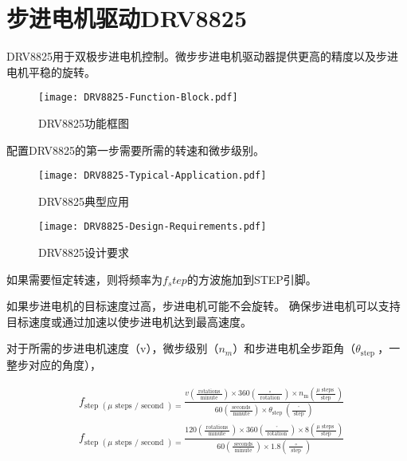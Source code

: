 \section{步进电机驱动DRV8825}

DRV8825用于双极步进电机控制。微步步进电机驱动器提供更高的精度以及步进电机平稳的旋转。

\begin{figure}[htbp]
    \centering
    \texttt{[image: DRV8825-Function-Block.pdf]}
    \caption{DRV8825功能框图}
    \label{fig:DRV8825-Function-Block}
\end{figure}

配置DRV8825的第一步需要所需的转速和微步级别。

\begin{figure}[htbp]
    \centering
    \texttt{[image: DRV8825-Typical-Application.pdf]}
    \caption{DRV8825典型应用}
    \label{fig:DRV8825-Typical-Application}
\end{figure}


\begin{figure}[htbp]
    \centering
    \texttt{[image: DRV8825-Design-Requirements.pdf]}
    \caption{DRV8825设计要求}
    \label{fig:DRV8825-Design-Requirements}
\end{figure}

如果需要恒定转速，则将频率为$f_step$的方波施加到STEP引脚。

如果步进电机的目标速度过高，步进电机可能不会旋转。 确保步进电机可以支持目标速度或通过加速以使步进电机达到最高速度。

对于所需的步进电机速度（v），微步级别（$n_m$）和步进电机全步距角（$\theta_{\text {step }}$，一整步对应的角度），

\begin{equation}
    \begin{aligned}
    &f_{\text {step }(\mu \text { steps } / \text { second })=} \frac{v\left(\frac{\text { rotations }}{\text { minute }}\right) \times 360\left(\frac{\circ}{\text { rotation }}\right) \times n_{\mathrm{m}}\left(\frac{\mu \text { steps }}{\text { step }}\right)}{60\left(\frac{\text { seconds }}{\text { minute }}\right) \times \theta_{\text {step }}\left(\frac{^{\circ}}{\text { step }}\right)}\\
    &f_{\text {step }(\mu \text { steps } / \text { second })=} \frac{120\left(\frac{\text { rotations }}{\text { minute }}\right) \times 360\left(\frac{^{\circ}}{\text { rotation }}\right) \times 8\left(\frac{\mu \text { steps }}{\text { step }}\right)}{60\left(\frac{\text { seconds }}{\text { minute }}\right) \times 1.8\left(\frac{\circ}{\text { step }}\right)}
    \end{aligned}
\end{equation}

